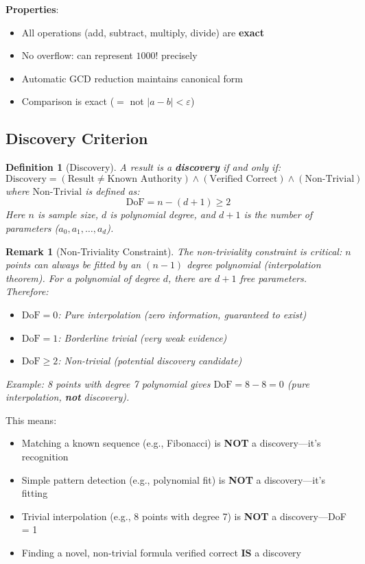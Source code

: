 \documentclass[11pt,a4paper]{article}
\newtheorem{definition}{Definition}
\newtheorem{remark}{Remark}
\begin{document}
\textbf{Properties}:
\begin{itemize}
    \item All operations (add, subtract, multiply, divide) are \textbf{exact}
    \item No overflow: can represent $1000!$ precisely
    \item Automatic GCD reduction maintains canonical form
    \item Comparison is exact ($=$ not $|a-b| < \varepsilon$)
\end{itemize}

\subsection{Discovery Criterion}

\begin{definition}[Discovery]
A result is a \textbf{discovery} if and only if:
\[
\text{Discovery} = (\text{Result} \neq \text{Known Authority}) \land (\text{Verified Correct}) \land (\text{Non-Trivial})
\]
where $\text{Non-Trivial}$ is defined as:
\[
\text{DoF} = n - (d + 1) \geq 2
\]
Here $n$ is sample size, $d$ is polynomial degree, and $d+1$ is the number of parameters ($a_0, a_1, \ldots, a_d$).
\end{definition}

\begin{remark}[Non-Triviality Constraint]
The non-triviality constraint is critical: $n$ points can \emph{always} be fitted by an $(n-1)$ degree polynomial (interpolation theorem). For a polynomial of degree $d$, there are $d+1$ free parameters. Therefore:
\begin{itemize}
    \item $\text{DoF} = 0$: Pure interpolation (zero information, guaranteed to exist)
    \item $\text{DoF} = 1$: Borderline trivial (very weak evidence)
    \item $\text{DoF} \geq 2$: Non-trivial (potential discovery candidate)
\end{itemize}
Example: 8 points with degree 7 polynomial gives $\text{DoF} = 8 - 8 = 0$ (pure interpolation, \textbf{not} discovery).
\end{remark}

This means:
\begin{itemize}
    \item Matching a known sequence (e.g., Fibonacci) is \textbf{NOT} a discovery---it's recognition
    \item Simple pattern detection (e.g., polynomial fit) is \textbf{NOT} a discovery---it's fitting
    \item Trivial interpolation (e.g., 8 points with degree 7) is \textbf{NOT} a discovery---DoF = 1
    \item Finding a novel, non-trivial formula verified correct \textbf{IS} a discovery
\end{itemize}
\end{document}

